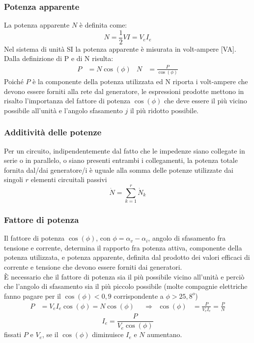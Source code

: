 \documentclass{article}
\begin{document}
\subsubsection{Potenza apparente}
La potenza apparente $N$ è definita come:
\[N = \frac{1}{2}VI=V_eI_e\]
Nel sistema di unità SI la potenza apparente è misurata in volt-ampere [VA].\\
Dalla definizione di P e di N risulta:
\begin{align*}
    P &= N \cos(\phi) & N &= \frac{P}{\cos(\phi)}
\end{align*}
Poiché $P$ è la componente della potenza utilizzata ed N riporta i volt-ampere
che devono essere forniti alla rete dal generatore, le espressioni prodotte
mettono in risalto l'importanza del fattore di potenza $\cos(\phi)$ che deve essere il
più vicino possibile all'unità e l'angolo sfasamento $j$ il più ridotto possibile.


\subsubsection{Additività delle potenze}
Per un circuito, indipendentemente dal fatto che le impedenze siano collegate in serie o in parallelo, o siano presenti entrambi i collegamenti, la potenza totale fornita dal/dai generatore/i è uguale alla somma delle potenze utilizzate dai singoli $r$ elementi circuitali passivi
\[\dot N = \sum_{k=1}^r\dot N_k\]

\subsubsection{Fattore di potenza}
Il fattore di potenza $\cos(\phi)$, con $\phi = \alpha_v-\alpha_i$, angolo di sfasamento fra
tensione e corrente, determina il rapporto fra potenza attiva, componente della potenza utilizzata, e potenza apparente, definita dal prodotto dei valori efficaci di corrente e tensione che devono essere forniti dai generatori.\\
È necessario che il fattore di potenza sia il più possibile vicino all'unità e perciò che l'angolo di sfasamento sia il più piccolo possibile (molte compagnie elettriche fanno pagare per il $\cos(\phi) < 0,9$ corrispondente a $\phi > 25,8^o$)
\begin{align*}
    P &= V_eI_e \cos(\phi)=N \cos(\phi) & &\Longrightarrow & \cos(\phi) &= \frac{P}{V_eI_e} = \frac{P}{N}
\end{align*}
\[I_e = \frac{P}{V_e \cos(\phi)}\]
fissati $P$ e $V_e$, se il $\cos(\phi)$ diminuisce $I_e$ e $N$ aumentano.
\end{document}
